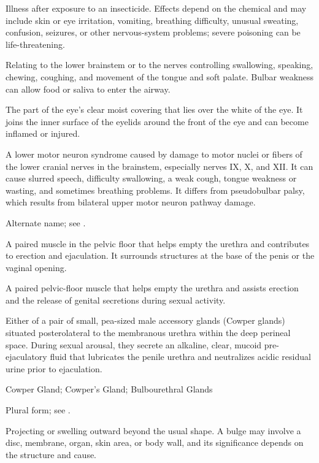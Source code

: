  Illness after exposure to an insecticide. Effects depend on the chemical and may include skin or eye irritation, vomiting, breathing difficulty, unusual sweating, confusion, seizures, or other nervous-system problems; severe poisoning can be life-threatening.

 Relating to the lower brainstem or to the nerves controlling swallowing, speaking, chewing, coughing, and movement of the tongue and soft palate. Bulbar weakness can allow food or saliva to enter the airway.

 The part of the eye's clear moist covering that lies over the white of the eye. It joins the inner surface of the eyelids around the front of the eye and can become inflamed or injured.

 A lower motor neuron syndrome caused by damage to motor nuclei or fibers of the lower cranial nerves in the brainstem, especially nerves IX, X, and XII. It can cause slurred speech, difficulty swallowing, a weak cough, tongue weakness or wasting, and sometimes breathing problems. It differs from pseudobulbar palsy, which results from bilateral upper motor neuron pathway damage.

 Alternate name; see .

 A paired muscle in the pelvic floor that helps empty the urethra and contributes to erection and ejaculation. It surrounds structures at the base of the penis or the vaginal opening.

 A paired pelvic-floor muscle that helps empty the urethra and assists erection and the release of genital secretions during sexual activity.

 Either of a pair of small, pea-sized male accessory glands (Cowper glands) situated posterolateral to the membranous urethra within the deep perineal space. During sexual arousal, they secrete an alkaline, clear, mucoid pre-ejaculatory fluid that lubricates the penile urethra and neutralizes acidic residual urine prior to ejaculation.

\synonyms
Cowper Gland; Cowper's Gland; Bulbourethral Glands

 Plural form; see .

 Projecting or swelling outward beyond the usual shape. A bulge may involve a disc, membrane, organ, skin area, or body wall, and its significance depends on the structure and cause.

